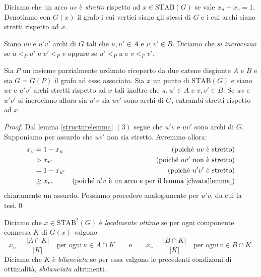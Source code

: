 \begin{definition}
	Diciamo che un arco \(uv\) è \emph{stretto} rispetto ad \(x\in\text{STAB}(G)\) se vale \(x_u+x_v=1\). Denotiamo con \(G(x)\) il grafo i cui vertici siano gli stessi di \(G\) e i cui archi siano stretti rispetto ad \(x\). 
\end{definition}
\begin{definition}
	Siano \(uv\) e \(u'v'\) archi di \(G\) tali che \(u,u'\in A\) e \(v,v'\in B\). Diciamo che \emph{si incrociano} se \(u<_{P}u'\) e \(v'<_{P}v\) oppure se \(u'<_{P}u\) e \(v<_{P}v'\). 
\end{definition}
\begin{lemma}
	\label{crossinglemma} Sia \(P\) un insieme parzialmente ordinato ricoperto da due catene disgiunte \(A\) e \(B\) e sia \(G=\overline{G}(P)\) il grafo ad esso associato. Sia \(x\) un punto di \(\text{STAB}(G)\) e siano \(uv\) e \(u'v'\) archi stretti rispetto ad \(x\) tali inoltre che \(u,u'\in A\) e \(v,v'\in B\). Se \(uv\) e \(u'v'\) si incrociano allora sia \(u'v\) sia \(uv'\) sono archi di \(G\), entrambi stretti rispetto ad \(x\). 
\end{lemma}
\begin{proof}
	Dal lemma \ref{structurelemma} \((3)\) segue che \(u'v\) e \(uv'\) sono archi di \(G\). Supponiamo per assurdo che \(uv'\) non sia stretto. Avremmo allora: 
	\begin{align}
		x_v &= 1-x_u &\text{(poich\'e } uv \text{ \`e stretto)}\nonumber \\
		&> x_{v'} &\text{(poich\'e } uv' \text{ non \`e stretto)}\nonumber \\
		&= 1-x_{u'} &\text{(poich\'e } u'v' \text{ \`e stretto)}\nonumber \\
		&\ge x_{v}, &\text{(poich\'e } u'v \text{ \`e un arco e per il lemma \ref{chvatallemma})}\nonumber 
	\end{align}
	chiaramente un assurdo. Possiamo procedere analogamente per \(u'v\), da cui la tesi.\qed 
\end{proof}
\begin{definition}
	Diciamo che \(x\in\text{STAB}^{*}(G)\) è \emph{localmente ottimo} se per ogni componente connessa \(K\) di \(G(x)\) valgono
	\[x_u=\frac{|A\cap K|}{|K|}\quad\text{per ogni}\,u\in A\cap K\qquad\text{e}\qquad x_v=\frac{|B\cap K|}{|K|}\quad\text{per ogni}\,v\in B\cap K.\]
	Diciamo che \(K\) è \emph{bilanciata} se per essa valgono le precedenti condizioni di ottimalità, \emph{sbilanciata} altrimenti. 
\end{definition}
